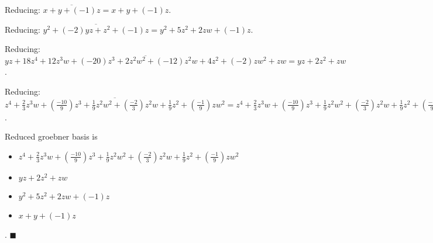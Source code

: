 \documentclass{jsarticle}
\begin{document}
Reducing: $\overline{x+y+(-1)z} = x+y+(-1)z$.  

Reducing: $\overline{y^{2}+(-2)yz+z^{2}+(-1)z} = y^{2}+5z^{2}+2zw+(-1)z$.  

Reducing: $\overline{yz+18z^{4}+12z^{3}w+(-20)z^{3}+2z^{2}w^{2}+(-12)z^{2}w+4z^{2}+(-2)zw^{2}+zw} = yz+2z^{2}+zw$.  

Reducing: $\overline{z^{4}+\frac{2}{3}z^{3}w+(\frac{-10}{9})z^{3}+\frac{1}{9}z^{2}w^{2}+(\frac{-2}{3})z^{2}w+\frac{1}{9}z^{2}+(\frac{-1}{9})zw^{2}} = z^{4}+\frac{2}{3}z^{3}w+(\frac{-10}{9})z^{3}+\frac{1}{9}z^{2}w^{2}+(\frac{-2}{3})z^{2}w+\frac{1}{9}z^{2}+(\frac{-1}{9})zw^{2}$.  

Reduced groebner basis is 
\begin{itemize}
\item $z^{4}+\frac{2}{3}z^{3}w+(\frac{-10}{9})z^{3}+\frac{1}{9}z^{2}w^{2}+(\frac{-2}{3})z^{2}w+\frac{1}{9}z^{2}+(\frac{-1}{9})zw^{2}$
\item $yz+2z^{2}+zw$
\item $y^{2}+5z^{2}+2zw+(-1)z$
\item $x+y+(-1)z$
\end{itemize}  . 
$\blacksquare{}$
\end{document}
